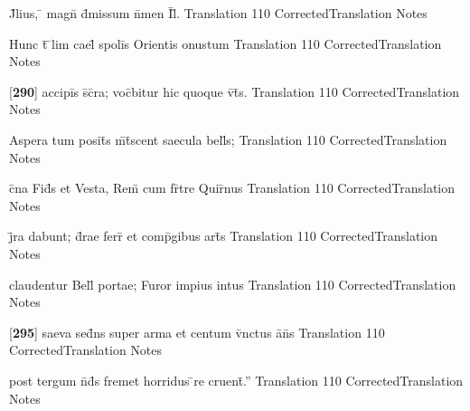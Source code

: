 \documentclass[]{book}
\begin{document}
\latline
  {J\={}lius, \={} magn\={} d\={}missum n\={}men I\={}l\={}.}
  { Translation }
  {110}
  { CorrectedTranslation }
  { Notes }


\latline
  {Hunc t\={} \={}lim cael\={} spoli\={\macron {\i}}s Orientis onustum}
  { Translation }
  {110}
  { CorrectedTranslation }
  { Notes }


\latline
  {[\textbf{290}] accipi\={}s s\={}c\={}ra; voc\={}bitur hic quoque v\={}t\={\macron {\i}}s.}
  { Translation }
  {110}
  { CorrectedTranslation }
  { Notes }


\latline
  {Aspera tum posit\={\macron {\i}}s m\={\macron {\i}}t\={}scent saecula bell\={\macron {\i}}s;}
  { Translation }
  {110}
  { CorrectedTranslation }
  { Notes }


\latline
  {c\={}na Fid\={}s et Vesta, Rem\={} cum fr\={}tre Quir\={\macron {\i}}nus}
  { Translation }
  {110}
  { CorrectedTranslation }
  { Notes }


\latline
  {j\={}ra dabunt; d\={\macron {\i}}rae ferr\={} et comp\={}gibus art\={\macron {\i}}s}
  { Translation }
  {110}
  { CorrectedTranslation }
  { Notes }


\latline
  {claudentur Bell\={\macron {\i}} portae; Furor impius intus}
  { Translation }
  {110}
  { CorrectedTranslation }
  { Notes }


\latline
  {[\textbf{295}] saeva sed\={}ns super arma et centum v\={\macron {\i}}nctus a\={}n\={\macron {\i}}s}
  { Translation }
  {110}
  { CorrectedTranslation }
  { Notes }


\latline
  {post tergum n\={}d\={\macron {\i}}s fremet horridus \={}re cruent\={}.''}
  { Translation }
  {110}
  { CorrectedTranslation }
  { Notes }
\end{document}
